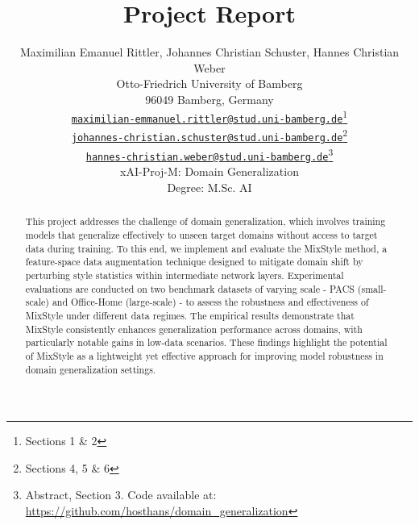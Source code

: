\documentclass[a4paper]{article}
\title{Project Report}
\author{%
 Maximilian Emanuel Rittler, Johannes Christian Schuster, Hannes Christian Weber %
    \\
  Otto-Friedrich University of Bamberg\\
  96049 Bamberg, Germany\\
  \href{mailto:maximilian-emanuel.rittler@stud.uni-bamberg.de}{\texttt{maximilian-emmanuel.rittler@stud.uni-bamberg.de}}\thanks{Sections 1 \& 2} \\
  \href{mailto:johannes-christian.schuster@stud.uni-bamberg.de}{\texttt{johannes-christian.schuster@stud.uni-bamberg.de}}\thanks{Sections 4, 5 \& 6}
   \\
   \href{mailto:hannes-christian.weber@stud.uni-bamberg.de}{\texttt{hannes-christian.weber@stud.uni-bamberg.de}}\thanks{Abstract, Section 3. Code available at: \url{https://github.com/hosthans/domain_generalization}}\\[0.5cm]
  xAI-Proj-M: Domain Generalization \\
  Degree: M.Sc. AI
}
\begin{document}
\maketitle
\def\va{{\bm{a}}}

\begin{abstract}
	This project addresses the challenge of domain generalization, which involves training models that generalize effectively to unseen target domains without access to target data during training. To this end, we implement and evaluate the MixStyle method, a feature-space data augmentation technique designed to mitigate domain shift by perturbing style statistics within intermediate network layers. Experimental evaluations are conducted on two benchmark datasets of varying scale - PACS (small-scale) and Office-Home (large-scale) - to assess the robustness and effectiveness of MixStyle under different data regimes. The empirical results demonstrate that MixStyle consistently enhances generalization performance across domains, with particularly notable gains in low-data scenarios. These findings highlight the potential of MixStyle as a lightweight yet effective approach for improving model robustness in domain generalization settings.
\end{abstract}
\clearpage






%
\clearpage




\clearpage




\clearpage


  
\end{document}
